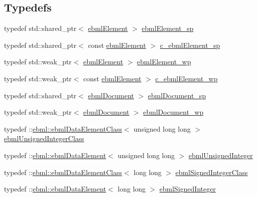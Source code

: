 \subsection*{Typedefs}
\begin{DoxyCompactItemize}
\item 
typedef std\+::shared\+\_\+ptr$<$ \mbox{\hyperlink{classebml_1_1ebmlElement}{ebml\+Element}} $>$ \mbox{\hyperlink{namespaceebml_adad533b7705a16bb360fe56380c5e7be}{ebml\+Element\+\_\+sp}}
\item 
typedef std\+::shared\+\_\+ptr$<$ const \mbox{\hyperlink{classebml_1_1ebmlElement}{ebml\+Element}} $>$ \mbox{\hyperlink{namespaceebml_a2deef4e8071531b32e3533f1bf978917}{c\+\_\+ebml\+Element\+\_\+sp}}
\item 
typedef std\+::weak\+\_\+ptr$<$ \mbox{\hyperlink{classebml_1_1ebmlElement}{ebml\+Element}} $>$ \mbox{\hyperlink{namespaceebml_a495fb58b42b0050d887415351af02935}{ebml\+Element\+\_\+wp}}
\item 
typedef std\+::weak\+\_\+ptr$<$ const \mbox{\hyperlink{classebml_1_1ebmlElement}{ebml\+Element}} $>$ \mbox{\hyperlink{namespaceebml_abc218c2fc1444b2fd8a8a5fae67e0151}{c\+\_\+ebml\+Element\+\_\+wp}}
\item 
typedef std\+::shared\+\_\+ptr$<$ \mbox{\hyperlink{classebml_1_1ebmlDocument}{ebml\+Document}} $>$ \mbox{\hyperlink{namespaceebml_a66018942b568da5041136a945148b450}{ebml\+Document\+\_\+sp}}
\item 
typedef std\+::weak\+\_\+ptr$<$ \mbox{\hyperlink{classebml_1_1ebmlDocument}{ebml\+Document}} $>$ \mbox{\hyperlink{namespaceebml_acfead4f724a6f8d55c730c6fbd362cea}{ebml\+Document\+\_\+wp}}
\item 
typedef \+::\mbox{\hyperlink{classebml_1_1ebmlDataElementClass}{ebml\+::ebml\+Data\+Element\+Class}}$<$ unsigned long long $>$ \mbox{\hyperlink{namespaceebml_a506b246c5594e5d0322c3c05e9820fd2}{ebml\+Unsigned\+Integer\+Class}}
\item 
typedef \+::\mbox{\hyperlink{classebml_1_1ebmlDataElement}{ebml\+::ebml\+Data\+Element}}$<$ unsigned long long $>$ \mbox{\hyperlink{namespaceebml_a094d15ef60da5dd0e74a4e379ac3e547}{ebml\+Unsigned\+Integer}}
\item 
typedef \+::\mbox{\hyperlink{classebml_1_1ebmlDataElementClass}{ebml\+::ebml\+Data\+Element\+Class}}$<$ long long $>$ \mbox{\hyperlink{namespaceebml_a344220b1a75e640887ea0d280f2349af}{ebml\+Signed\+Integer\+Class}}
\item 
typedef \+::\mbox{\hyperlink{classebml_1_1ebmlDataElement}{ebml\+::ebml\+Data\+Element}}$<$ long long $>$ \mbox{\hyperlink{namespaceebml_a5429f4885c9e4e9eeda85b245ea6166a}{ebml\+Signed\+Integer}}

\end{DoxyCompactItemize}
